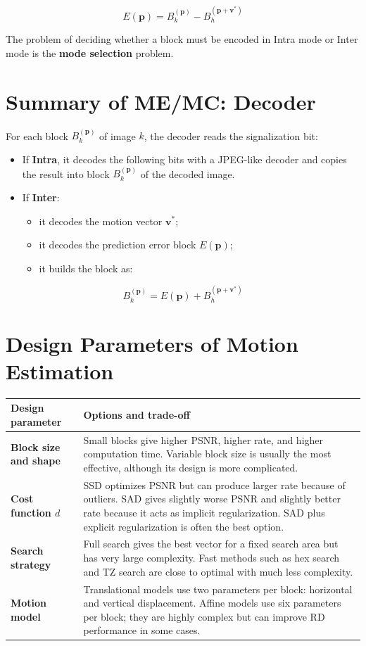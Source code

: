 \[
E(\mathbf{p}) =
B_k^{(\mathbf{p})} - B_h^{(\mathbf{p}+\mathbf{v}^*)}
\]

The problem of deciding whether a block must be encoded in Intra mode or Inter mode is the \textbf{mode selection} problem.

\section{Summary of ME/MC: Decoder}

For each block $B_k^{(\mathbf{p})}$ of image $k$, the decoder reads the signalization bit:

\begin{itemize}
\item If \textbf{Intra}, it decodes the following bits with a JPEG-like decoder and copies the result into block $B_k^{(\mathbf{p})}$ of the decoded image.
\item If \textbf{Inter}:
\begin{itemize}
\item it decodes the motion vector $\mathbf{v}^*$;
\item it decodes the prediction error block $E(\mathbf{p})$;
\item it builds the block as:
\end{itemize}
\end{itemize}

\[
B_k^{(\mathbf{p})} =
E(\mathbf{p}) + B_h^{(\mathbf{p}+\mathbf{v}^*)}
\]

\section{Design Parameters of Motion Estimation}

\begin{center}
\begin{tabular}{|l|l|}
\hline
\textbf{Design parameter} & \textbf{Options and trade-off} \\ \hline
\textbf{Block size and shape} & Small blocks give higher PSNR, higher rate, and higher computation time. Variable block size is usually the most effective, although its design is more complicated. \\ \hline
\textbf{Cost function $d$} & SSD optimizes PSNR but can produce larger rate because of outliers. SAD gives slightly worse PSNR and slightly better rate because it acts as implicit regularization. SAD plus explicit regularization is often the best option. \\ \hline
\textbf{Search strategy} & Full search gives the best vector for a fixed search area but has very large complexity. Fast methods such as hex search and TZ search are close to optimal with much less complexity. \\ \hline
\textbf{Motion model} & Translational models use two parameters per block: horizontal and vertical displacement. Affine models use six parameters per block; they are highly complex but can improve RD performance in some cases. \\ \hline
\end{tabular}
\end{center}

